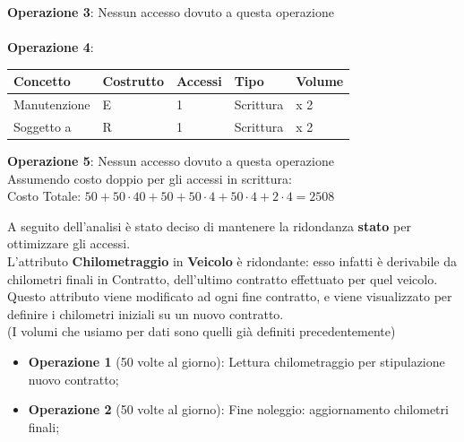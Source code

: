 \documentclass[10pt,a4paper]{article}
\begin{document}
\noindent
\textbf{Operazione 3}: Nessun accesso dovuto a questa operazione
\\\\
\noindent
\textbf{Operazione 4}:
\begin{table} [H]
\centering
\begin{tabular}{|p{2cm}|p{2cm}|p{2cm}|p{2cm}|p{1.5cm}|}
\hline
\textbf{Concetto} & \textbf{Costrutto} & \textbf{Accessi} & \textbf{Tipo} & \textbf{Volume} \\
\hline
Manutenzione & E & 1 & Scrittura & x 2 \\
\hline
Soggetto a & R & 1 & Scrittura & x 2 \\
\hline
\end{tabular}
\end{table}

\noindent
\textbf{Operazione 5}: Nessun accesso dovuto a questa operazione\\

\noindent
Assumendo costo doppio per gli accessi in scrittura:\\
 Costo Totale: $50 + 50\cdot40 + 50 + 50\cdot4 + 50\cdot4 + 2\cdot4 = 2508$


\noindent
A seguito dell’analisi è stato deciso di mantenere la ridondanza \textbf{stato} per ottimizzare gli accessi.\\




\noindent
L’attributo \textbf{Chilometraggio} in \textbf{Veicolo} è ridondante: esso infatti è derivabile da chilometri finali in Contratto, dell’ultimo contratto effettuato per quel veicolo.\\
Questo attributo viene modificato ad ogni fine contratto, e viene visualizzato per definire i chilometri iniziali su un nuovo contratto. \\
(I volumi che usiamo per dati sono quelli già definiti precedentemente)


\begin{itemize}
\item \textbf{Operazione 1} (50 volte al giorno): Lettura chilometraggio per stipulazione nuovo contratto;
\item \textbf{Operazione 2} (50 volte al giorno): Fine noleggio: aggiornamento chilometri finali;
\end{itemize}
\end{document}
